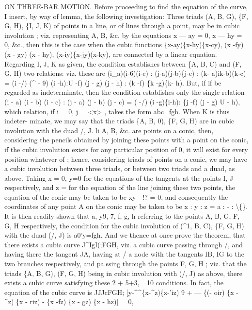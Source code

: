 \documentclass[11pt,a4paper]{book}
\begin{document}
ON THREE-BAR MOTION.
Before
proceeding
to
find
the
equation
of
the
curve,
I
insert,
by way of lemma,
the
following
investigation:
Three
triads
(A,
B,
G),
\{F,
G,
H),
\{I,
J, K)
of
points
in
a
line,
or
of
lines
through
a
point,
may
be
in
cubic
involution
;
viz.
representing A,
B,
\&c.
by
the
equations x --- ay = 0, x --- hy = 0,
\&c., then
this
is
the
case when the cubic
functions
\{x-ay)\{x-hy)\{x-cy),
(x -fy) (x - gy) (x - hy),
(x-iy)\{x-jy)(x-ky),
are
connected
by
a
linear
equation.
Regarding
I,
J, K
as
given,
the
condition
establishes between
\{A, B,
C) and
(F,
G, H) two
relations:
viz.
these
are
(i\_a)(i-6)(i-c)
: (j-a)(j-b)\{j-c)
: (k- a)ik-b)(k-c)
= (i -/) (\textasciicircum{} - 9) (i -h):U -f) (j - g) (j - h)
: (k -f) \{k -g)\{k- h).
But,
if
if
be
regarded
as
indeterminate,
then
the
condition
establishes
only
the
single
relation
(i - a) (i - b) (i - c)
:
(j - a) (j - b) (j - c)
=
(\guillemotright{}\textbullet{} -/) (i -g)\{i-h):
\{j -f) (j - g) U - h),
which
relation,
if
i = 0, j =
<x>
,
takes
the
form
abc=fgh.
When K
is
thus
indeter-
minate, we
may
say
that
the
triads
\{A,
B,
0),
\{F,
G, H)
are
in
cubic
involution
with the duad
/,
J.
li A,
B,
\&c.
are
points
on
a
conic,
then,
considering
the
pencils
obtained
by
joining
these
points
with
a
point
on
the
conic,
if
the
cubic
involution
exists
for
any
particular
position
of
0,
it
will
exist
for
every
position
whatever
of
;
hence,
considering
triads
of
points
on
a
conic, we
may
have
a
cubic
involution
between
three
triads, or between two
triads and a duad,
as above.
Taking x = 0, y=0
for the equations of the tangents at the points
I, J respectively,
and
z =
for
the
equation
of
the
line
joining
these
two
points,
the
equation
of
the
conic may
be
taken
to
be xy---!? = 0,
and
consequently
the
coordinates
of
any
point
A
on
the
conic may be
taken to
be
x
: y
: z = a
: -
:
\textbackslash\{\}.
It
is
then
readily
shown
that
a,
y9,
7, f, g, h referring
to
the
points A, B,
G, F,
G, H respectively, the condition
for the cubic involution
of (\textasciicircum{}1, B,
C), \{F,
G, H) with the duad
(/, J)
is a0'y=fgh.
And
we
thence
at
once
prove
the
theorem,
that
there
exists
a
cubic
curve
J\textasciicircum{}IgI(;FGH,
viz. a
cubic
curve
passing
through
/,
and
having
there
the
tangent JA,
having
at /
a
node
with
the
tangents
IB, IG
to
the
two
branches
respectively,
and
pa.ssing through
the points F,
G, H
;
viz.
that
the
triads \{A, B,
G),
(F,
G, H) being
in
cubic
involution
with
(/,
J)
as
above,
there
exists
a
cubic
curve
satisfying
these
2 + 5+3, =10
conditions.
In
fact, the equation of the cubic curve
is
JJJcFGH; [y-\textasciicircum{}\textasciicircum{}\{x-\textasciicircum{}z)\{x-'iz)
9
+ --- \{(\guillemotleft{}- oir) \{x - \textasciicircum{}z) \{x - riz) - \{x -fz) \{x - gz) \{x - hz)] = 0,
\end{document}
